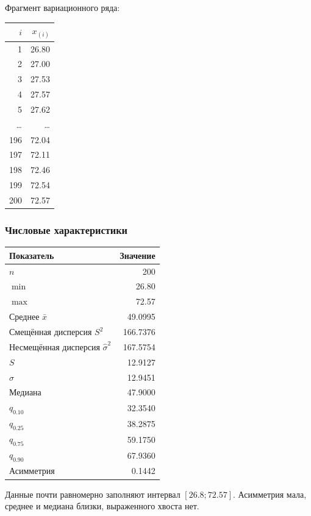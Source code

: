 \documentclass[12pt,a4paper]{article}
\begin{document}
Фрагмент вариационного ряда:

\begin{center}
\begin{tabular}{rr}
\toprule
$i$ & $x_{(i)}$ \\
\midrule
1 & 26.80 \\
2 & 27.00 \\
3 & 27.53 \\
4 & 27.57 \\
5 & 27.62 \\
\dots & \dots \\
196 & 72.04 \\
197 & 72.11 \\
198 & 72.46 \\
199 & 72.54 \\
200 & 72.57 \\
\bottomrule
\end{tabular}
\end{center}

\subsubsection*{Числовые характеристики}

\begin{center}
\begin{tabular}{>{\raggedright\arraybackslash}p{}r}
\toprule
Показатель & Значение \\
\midrule
$n$ & 200 \\
$\min$ & 26.80 \\
$\max$ & 72.57 \\
Среднее $\bar{x}$ & 49.0995 \\
Смещённая дисперсия $S^2$ & 166.7376 \\
Несмещённая дисперсия $\hat{\sigma}^2$ & 167.5754 \\
$S$ & 12.9127 \\
$\hat{\sigma}$ & 12.9451 \\
Медиана & 47.9000 \\
$q_{0.10}$ & 32.3540 \\
$q_{0.25}$ & 38.2875 \\
$q_{0.75}$ & 59.1750 \\
$q_{0.90}$ & 67.9360 \\
Асимметрия & 0.1442 \\
\bottomrule
\end{tabular}
\end{center}

Данные почти равномерно заполняют интервал $[26.8; 72.57]$. Асимметрия мала, среднее и медиана близки, выраженного хвоста нет.
\end{document}
